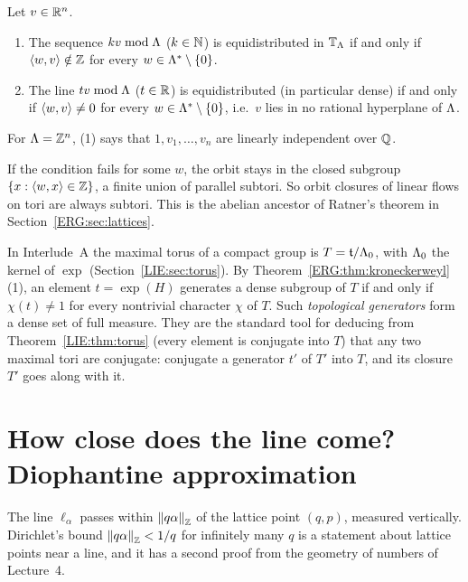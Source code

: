 \begin{theorem}\label{ERG:thm:kroneckerweyl}
Let $v\in\mathbb{R}^n$.
\begin{enumerate}[nosep]
\item The sequence $kv\bmod\Lambda$ ($k\in\mathbb{N}$) is equidistributed in $\mathbb{T}_\Lambda$ if and only if
  $\langle w, v\rangle\notin\mathbb{Z}$ for every $w\in\Lambda^*\setminus\{0\}$.
\item The line $tv\bmod\Lambda$ ($t\in\mathbb{R}$) is equidistributed (in particular dense) if and only if
  $\langle w, v\rangle\neq0$ for every $w\in\Lambda^*\setminus\{0\}$, i.e.\ $v$ lies in no rational hyperplane of
  $\Lambda$.
\end{enumerate}
For $\Lambda=\mathbb{Z}^n$, (1) says that $1,v_1,\dots,v_n$ are linearly independent over $\mathbb{Q}$.
\end{theorem}

If the condition fails for some $w$, the orbit stays in the closed subgroup $\{x:\langle w, x\rangle\in\mathbb{Z}\}$,
a finite union of parallel subtori. So orbit closures
of linear flows on tori are always subtori. This is the abelian ancestor of Ratner's theorem in
Section~\ref{ERG:sec:lattices}.

\begin{remark}
In Interlude~A the maximal torus of a compact group is $T=\mathfrak t/\Lambda_0$, with $\Lambda_0$ the kernel
of $\exp$ (Section~\ref{LIE:sec:torus}). By Theorem~\ref{ERG:thm:kroneckerweyl}(1), an element
$t=\exp(H)$ generates a dense subgroup of $T$ if and only if $\chi(t)\neq1$ for every nontrivial
character $\chi$ of $T$. Such \emph{topological generators} form a dense set of full measure. They are
the standard tool for deducing from Theorem~\ref{LIE:thm:torus} (every element is conjugate into $T$)
that any two maximal tori are conjugate: conjugate a generator $t'$ of $T'$ into $T$, and its closure
$T'$ goes along with it.
\end{remark}

\section{How close does the line come? Diophantine approximation}
\label{ERG:sec:dioph}

The line $\ell_\alpha$ passes within $\left\lVert q\alpha \right\rVert_{\mathbb{Z}}$ of the lattice point $(q,p)$, measured
vertically. Dirichlet's bound $\left\lVert q\alpha \right\rVert_{\mathbb{Z}}<1/q$ for infinitely many $q$ is a statement about
lattice points near a line, and it has a second proof from the geometry of numbers of Lecture~4.

